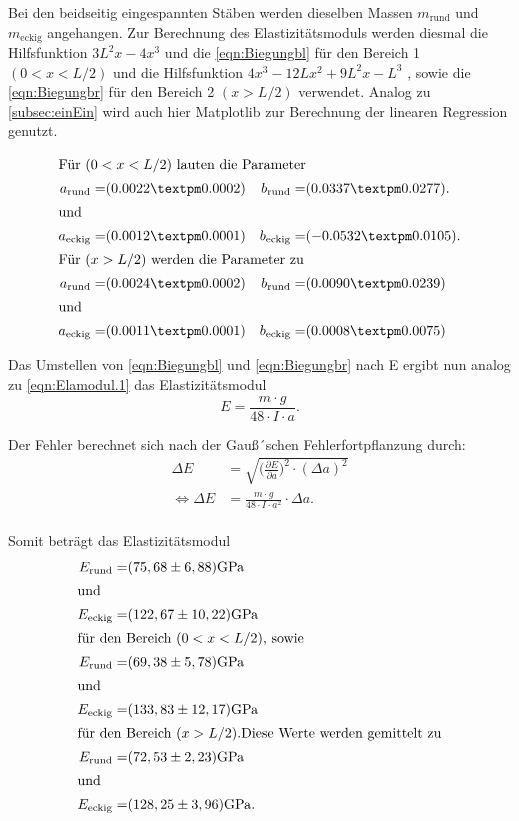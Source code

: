 Bei den beidseitig eingespannten Stäben werden dieselben Massen $m_{\text{rund}}$ und $m_{\text{eckig}}$ angehangen.
Zur Berechnung des Elastizitätsmoduls werden diesmal die Hilfsfunktion $3L^2x - 4x^3$ und die \autoref{eqn:Biegungbl} für den Bereich 1 $(0<x<L/2)$ und die Hilfsfunktion $4x^3-12Lx^2+9L^2x-L^3$ , sowie die \autoref{eqn:Biegungbr} für den Bereich 2 $(x>L/2)$
verwendet. Analog zu \autoref{subsec:einEin} wird auch hier Matplotlib zur Berechnung der linearen Regression genutzt.

\begin{align*}
  \intertext{Für $(0<x<L/2)$ lauten die Parameter}
  a_{\text{rund}} =&(0.0022 ± 0.0002) & b_{\text{rund}}=& (0.0337 ± 0.0277).\\
  \shortintertext{und}
  a_{\text{eckig}} =&(0.0012 ± 0.0001) & b_{\text{eckig}}=& (-0.0532 ± 0.0105).\\
  \intertext{Für $(x>L/2)$ werden die Parameter zu}
  a_{\text{rund}} =&(0.0024 ± 0.0002) & b_{\text{rund}}=& (0.0090 ± 0.0239)\\
  \shortintertext{und}
  a_{\text{eckig}} =&(0.0011 ± 0.0001) & b_{\text{eckig}}=& (0.0008 ± 0.0075)\\
 \end{align*}

 Das Umstellen von \autoref{eqn:Biegungbl} und \autoref{eqn:Biegungbr} nach E ergibt nun analog zu \autoref{eqn:Elamodul.1} das Elastizitätsmodul
 \begin{equation*}
  E = \frac{m\cdot g}{48\cdot I \cdot a}.
  \label{eqn:e-ein}
  \end{equation*}

Der Fehler berechnet sich nach der Gauß´schen Fehlerfortpflanzung durch:
\begin{equation*}
  \begin{aligned}
  \Delta E &= \sqrt{\biggl(\frac{\partial E}{\partial a}\biggr)^2\cdot (\Delta a)^2} \\
  \iff \Delta E &= \frac{m\cdot g}{48\cdot I \cdot a^2} \cdot \Delta a.\\
  \label{eqn:e-fehler-beid}
  \end{aligned}
  \end{equation*}

Somit beträgt das Elastizitätsmodul
\begin{align*}
  E_{\text{rund}}=&(75,68\pm6,88)\si{\giga\pascal}\\
  \shortintertext{und}
  E_{\text{eckig}}=&(122,67\pm10,22)\si{\giga\pascal}\\
  \intertext{für den Bereich $(0<x<L/2)$, sowie}
  E_{\text{rund}}=&(69,38\pm5,78)\si{\giga\pascal}\\
  \shortintertext{und}
  E_{\text{eckig}}=&(133,83\pm12,17)\si{\giga\pascal}\\
  \intertext{für den Bereich $(x>L/2)$.Diese Werte werden gemittelt zu}
  E_{\text{rund}}=&(72,53\pm2,23)\si{\giga\pascal}\\
  \intertext{und}
  E_{\text{eckig}}=&(128,25\pm3,96)\si{\giga\pascal}.
  \label{eqn:Ebeid} 
\end{align*}

\pagebreak



